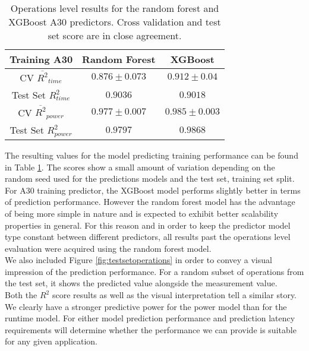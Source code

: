 \begin{table}[h!]
\centering
\begin{tabular}{|c|c|c|}
\hline
 \textbf{Training A30}& \textbf{Random Forest} & \textbf{XGBoost} \\
\hline
CV $\overline{R^2}_{time}$ & $0.876 \pm 0.073$ &  $0.912 \pm 0.04$ \\
\hline
Test Set $R^2_{time}$ & $0.9036$ & $0.9018$ \\
\hline
CV $\overline{R^2}_{power}$ & $0.977 \pm 0.007$  &  $0.985 \pm 0.003$\\
\hline
Test Set $R^2_{power}$ & $0.9797$ & $0.9868$ \\
\hline
\end{tabular}
\caption{Operations level results for the random forest and XGBoost A30 predictors. Cross validation and test set score are in close agreement.}
\label{tab:pred_res}
\end{table}



The resulting values for the model predicting training performance can be found in Table \ref{tab:pred_res}. The scores show a small amount of variation depending on the random seed used for the predictions models and the test set, training set split. \\
For A30 training predictor, the XGBoost model performs slightly better in terms of prediction performance. However the random forest model has the advantage of being more simple in nature and is expected to exhibit better scalability properties in general. For this reason and in order to keep the predictor model type constant between different predictors, all results past the operations level evaluation were acquired using the random forest model. \\
We also included Figure \ref{fig:testsetoperations} in order to convey a visual impression of the prediction performance. For a random subset of operations from the test set, it shows the predicted value alongside the measurement value. \\
Both the $R^2$ score results as well as the visual interpretation tell a similar story. We clearly have a stronger predictive power for the power model than for the runtime model. For either model prediction performance and prediction latency requirements will determine whether the performance we can provide is suitable for any given application.


